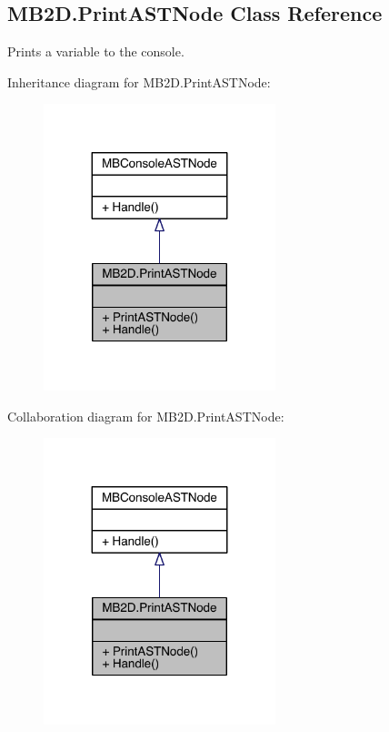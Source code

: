 \hypertarget{class_m_b2_d_1_1_print_a_s_t_node}{}\subsection{M\+B2\+D.\+Print\+A\+S\+T\+Node Class Reference}
\label{class_m_b2_d_1_1_print_a_s_t_node}


Prints a variable to the console.  




Inheritance diagram for M\+B2\+D.\+Print\+A\+S\+T\+Node\+:
\nopagebreak
\begin{figure}[H]
\begin{center}
\leavevmode
\includegraphics[width=191pt]{class_m_b2_d_1_1_print_a_s_t_node__inherit__graph}
\end{center}
\end{figure}


Collaboration diagram for M\+B2\+D.\+Print\+A\+S\+T\+Node\+:
\nopagebreak
\begin{figure}[H]
\begin{center}
\leavevmode
\includegraphics[width=191pt]{class_m_b2_d_1_1_print_a_s_t_node__coll__graph}
\end{center}
\end{figure}
